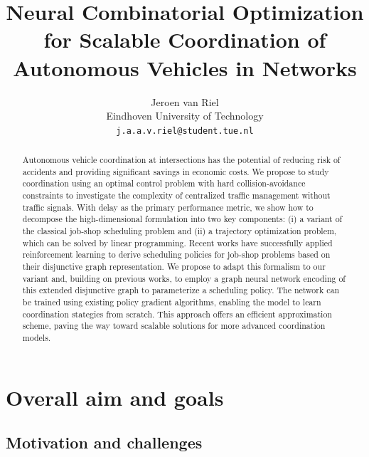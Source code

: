 \documentclass{article}
\title{Neural Combinatorial Optimization for Scalable Coordination of Autonomous
  Vehicles in Networks}
\author{
 Jeroen van Riel \\
Eindhoven University of Technology\\
  \texttt{j.a.a.v.riel@student.tue.nl} \\
}
\theoremstyle{definition}
\theoremstyle{plain}
\begin{document}
\maketitle

\begin{abstract}
  Autonomous vehicle coordination at intersections has the potential of reducing
  risk of accidents and providing significant savings in economic costs.
  We propose to study coordination using an optimal control problem with hard
  collision-avoidance constraints to investigate the complexity of centralized
  traffic management without traffic signals.
  With delay as the primary performance metric, we show how to decompose the
  high-dimensional formulation into two key components: (i) a variant of the
  classical job-shop scheduling problem and (ii) a trajectory optimization
  problem, which can be solved by linear programming.
  Recent works have successfully applied reinforcement learning to derive
  scheduling policies for job-shop problems based on their disjunctive graph
  representation.
  We propose to adapt this formalism to our variant and, building on previous
  works, to employ a graph neural network encoding of this extended disjunctive
  graph to parameterize a scheduling policy. The network can be trained using
  existing policy gradient algorithms, enabling the model to learn coordination
  stategies from scratch.
  This approach offers an efficient approximation scheme, paving the way toward
  scalable solutions for more advanced coordination models.
\end{abstract}


\section{Overall aim and goals}

\subsection{Motivation and challenges}
\label{sec:motivation}
\end{document}
